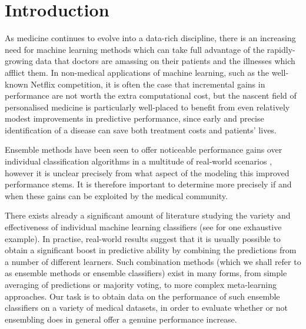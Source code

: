 \documentclass{bioinfo}
\begin{document}
\maketitle

\section{Introduction}

As medicine continues to evolve into a data-rich discipline, there is an increasing need for machine learning methods which can take full advantage of the rapidly-growing data that doctors are amassing on their patients and the illnesses which afflict them. In non-medical applications of machine learning, such as the well-known Netflix competition\textcolor{red}{\cite{netflixprize}}, it is often the case that incremental gains in performance are not worth the extra computational cost, but the nascent  field of personalised medicine is particularly well-placed to benefit from even  relatively modest improvements in  predictive performance, since early  and precise identification of a disease can save both treatment costs and patients' lives. 

Ensemble methods have been seen to offer noticeable performance gains over individual classification algorithms in a multitude of real-world scenarios \textcolor{red}{\cite{netflixprize}\cite{kagglecompetitions}\cite{kaggleguide}}, however it is unclear precisely from what aspect of the modeling this improved performance stems.  It is therefore important to determine more precisely if and when these gains can be exploited by the medical community.

There exists already a significant amount of literature studying the variety and effectiveness of individual machine learning classifiers (see \cite{classifiercomparison} for one exhaustive example). In practise, real-world results suggest that it is usually possible to obtain a significant boost in predictive ability by combining the predictions from a number of different learners. Such combination methods (which we shall refer to as ensemble methods or ensemble classifiers) exist in many forms, from simple averaging of predictions or majority voting, to more complex meta-learning approaches. Our task is to obtain data on the performance of such ensemble classifiers on a variety of medical datasets, in order to evaluate whether or not ensembling does in general offer a genuine performance increase.
\end{document}
